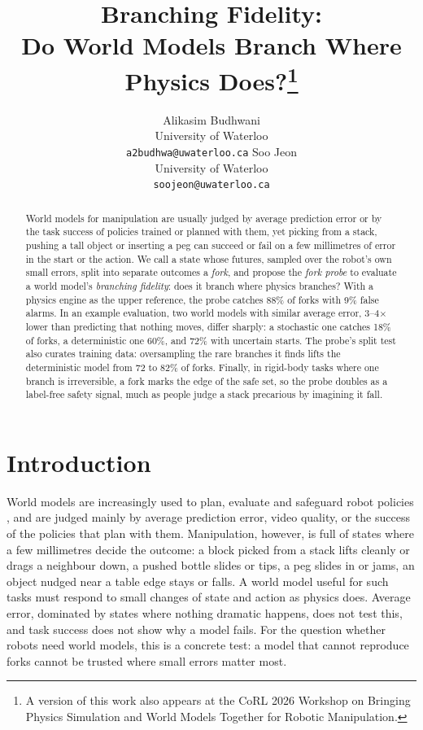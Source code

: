 \documentclass{article}
\title{Branching Fidelity:\\ Do World Models Branch Where Physics Does?\thanks{A version of this work also appears at the CoRL 2026 Workshop on Bringing Physics Simulation and World Models Together for Robotic Manipulation.}}
\author{
  Alikasim Budhwani\\
  University of Waterloo\\
  \texttt{a2budhwa@uwaterloo.ca}
  \And
  Soo Jeon\\
  University of Waterloo\\
  \texttt{soojeon@uwaterloo.ca}
}
\begin{document}
\maketitle

\begin{abstract}
World models for manipulation are usually judged by average prediction error or by the task success of
policies trained or planned with them, yet picking from a stack,
pushing a tall object or inserting a peg can succeed or fail on a few millimetres of error in the start or
the action. We call a state whose futures, sampled over the robot's own small errors, split into separate
outcomes a \emph{fork}, and propose the \emph{fork probe} to evaluate a world model's \emph{branching
fidelity}: does it branch where physics branches? With a physics engine as the upper reference, the probe
catches 88\% of forks with 9\% false alarms. In an example evaluation, two world models with similar average error, 3--4$\times$ lower than
predicting that nothing moves, differ sharply: a stochastic one catches 18\% of forks, a deterministic one
60\%, and 72\% with uncertain starts. The probe's split test also curates training data: oversampling the
rare branches it finds lifts the deterministic model from 72 to 82\% of forks. Finally, in rigid-body
tasks where one branch is irreversible, a fork marks the edge of the safe set, so the probe doubles as a
label-free safety signal, much as people judge a stack precarious by imagining it fall.
\end{abstract}


\section{Introduction}
World models are increasingly used to plan, evaluate and safeguard robot policies
\citep{zhou2025dinowm,assran2025vjepa2,hafner2025dreamerv3}, and are judged mainly by average prediction
error, video quality, or the success of the policies that plan with them. Manipulation, however, is full of states where a few millimetres decide the outcome: a block picked
from a stack lifts cleanly or drags a neighbour down, a pushed bottle slides or tips, a peg slides in or
jams, an object nudged near a table edge stays or falls. A world model useful for such tasks
must respond to small changes of state and action as physics does. Average error, dominated by states
where nothing dramatic happens, does not test this, and task success does not show why a model fails. For the question whether robots need world
models, this is a concrete test: a model that cannot reproduce forks cannot be trusted where small errors
matter most.
\end{document}
